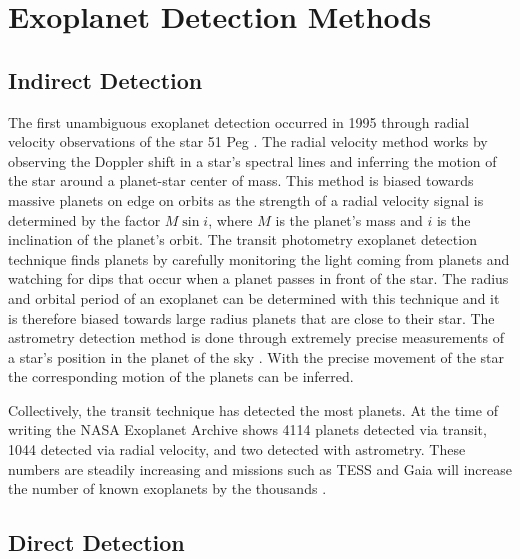 
\section{Exoplanet Detection Methods}
\label{sec:detection_methods}

\subsection{Indirect Detection} 

The first unambiguous exoplanet detection occurred in 1995 through radial
velocity observations of the star 51 Peg \citep{mayorJupitermassCompanion1995}.
The radial velocity method works by observing the Doppler shift in a star's
spectral lines and inferring the motion of the star around a planet-star center
of mass. This method is biased towards massive planets on edge on orbits as the
strength of a radial velocity signal is determined by the factor $M\sin{i}$,
where $M$ is the planet's mass and $i$ is the inclination of the planet's
orbit. The transit photometry exoplanet detection technique finds planets by
carefully monitoring the light coming from planets and watching for dips that
occur when a planet passes in front of the star. The radius and orbital period
of an exoplanet can be determined with this technique and it is therefore
biased towards large radius planets that are close to their star. The
astrometry detection method is done through extremely precise measurements of a
star's position in the planet of the sky \citep{Perryman2018a}. With the
precise movement of the star the corresponding motion of the planets can be
inferred.

Collectively, the transit technique has detected the most planets. At the time
of writing the NASA Exoplanet Archive shows 4114 planets detected via transit,
1044 detected via radial velocity, and two detected with astrometry. These
numbers are steadily increasing and missions such as TESS and Gaia will
increase the number of known exoplanets by the thousands \citep{Perryman2018a}
\citep{Huang2018}.


\subsection{Direct Detection}

